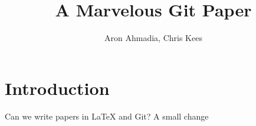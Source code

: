\documentclass[12pt]{article}
\author{Aron Ahmadia, Chris Kees} \title{A Marvelous Git Paper}
\begin{document}
\maketitle

\section{Introduction}

Can we write papers in LaTeX and Git?
A small change
\end{document}
